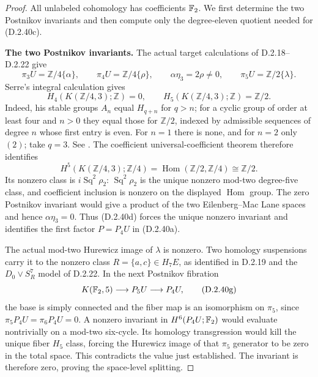 \begin{proof}
All unlabeled cohomology has coefficients $\mathbb F_2$.
We first determine the two Postnikov invariants and then compute
only the degree-eleven quotient needed for \textup{(D.2.40c)}.

\medskip\noindent
\textbf{The two Postnikov invariants.}
The actual target calculations of D.2.18--D.2.22 give
\[
 \pi_3U=\mathbb Z/4\{\alpha\},\qquad
 \pi_4U=\mathbb Z/4\{\rho\},\qquad
 \alpha\eta_3=2\rho\ne0,\qquad
 \pi_5U=\mathbb Z/2\{\lambda\}.
 \tag{D.2.40d}
\]
Serre's integral calculation gives
\[
 H_4(K(\mathbb Z/4,3);\mathbb Z)=0,
 \qquad H_5(K(\mathbb Z/4,3);\mathbb Z)=\mathbb Z/2.
 \tag{D.2.40e}
\]
Indeed, his stable groups $A_n$ equal $H_{q+n}$ for $q>n$;
for a cyclic group of order at least four and $n>0$ they equal
those for $\mathbb Z/2$, indexed by admissible sequences of
degree $n$ whose first entry is even.  For $n=1$ there is none,
and for $n=2$ only $(2)$; take $q=3$.
See \cite[\S2, nos.~14--15, pp.~207--209,
Theorems~8--9]{I_Serre1953}.
The coefficient universal-coefficient theorem therefore identifies
\[
 H^5(K(\mathbb Z/4,3);\mathbb Z/4)
       =\operatorname{Hom}(\mathbb Z/2,\mathbb Z/4)
       \cong\mathbb Z/2.
 \tag{D.2.40f}
\]
Its nonzero class is $i\operatorname{Sq}^2\rho_2$:
$\operatorname{Sq}^2\rho_2$ is the unique nonzero mod-two
degree-five class, and coefficient inclusion is nonzero on
the displayed $\operatorname{Hom}$ group.
The zero Postnikov invariant would give a product of the two
Eilenberg--Mac Lane spaces and hence $\alpha\eta_3=0$.
Thus \textup{(D.2.40d)} forces the unique nonzero invariant and
identifies the first factor $P=P_4U$ in \textup{(D.2.40a)}.

The actual mod-two Hurewicz image of $\lambda$ is nonzero.
Two homology suspensions carry it to the nonzero class
$R=\{a,c\}\in H_7E$, as identified in D.2.19 and the
$D_0\vee S^7_R$ model of D.2.22.
In the next Postnikov fibration
\[
 K(\mathbb F_2,5)\longrightarrow P_5U\longrightarrow P_4U,
 \tag{D.2.40g}
\]
the base is simply connected and the fiber map is an isomorphism
on $\pi_5$, since $\pi_5P_4U=\pi_6P_4U=0$.
A nonzero invariant in $H^6(P_4U;\mathbb F_2)$ would evaluate
nontrivially on a mod-two six-cycle.  Its homology transgression
would kill the unique fiber $H_5$ class, forcing the Hurewicz
image of that $\pi_5$ generator to be zero in the total space.
This contradicts the value just established.  The invariant is
therefore zero, proving the space-level splitting.


\end{proof}
